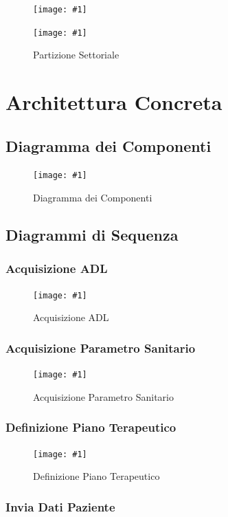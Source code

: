 \documentclass[a4paper,11pt,oneside, table]{article}
\newcommand{\putimage}[4] {
	\begin{figure}[H]
	    \centering
	    \texttt{[image: \#1]}
	    \caption{#2}\label{#3}
	\end{figure}
}
\newcommand{\putsubimage}[5] {
  \begin{minipage}{{#4}\linewidth}
	    \centering
      \texttt{[image: \#1]}
	    \caption{#2}\label{#3}
	\end{minipage}
}
\newcommand{\putimagecouple}[2] {
  \begin{figure}[!htb]
      \centering
      #1
      \hspace{0.5cm}
      #2
  \end{figure}
}
\begin{document}
\putimagecouple
{\putsubimage{images/metriche-livellata.png}{Partizione per Livelli}{png:metriche-livellata}{0.45}{1}}
{\putsubimage{images/metriche-settoriale.png}{Partizione Settoriale}{png:metriche-settoriale}{0.45}{1}}

\section{Architettura Concreta}

\subsection{Diagramma dei Componenti}

\putimage{images/Diagramma dei Componenti.png}{Diagramma dei Componenti}{png:diagramma-dei-componenti}{1}

\subsection{Diagrammi di Sequenza}

\subsubsection{Acquisizione ADL}

\putimage{images/Diagramma di Sequenza/Acquisizione ADL.png}{Acquisizione ADL}{png:acquisizione-adl}{1}


\subsubsection{Acquisizione Parametro Sanitario}

\putimage{images/Diagramma di Sequenza/Acquisizione Parametro Sanitario.png}{Acquisizione Parametro Sanitario}{png:acquisizione-parametro-sanitario}{1}


\subsubsection{Definizione Piano Terapeutico}

\putimage{images/Diagramma di Sequenza/Definizione Piano Terapeutico.png}{Definizione Piano Terapeutico}{png:definizione-piano-terapeutico}{1}


\subsubsection{Invia Dati Paziente}
\end{document}

